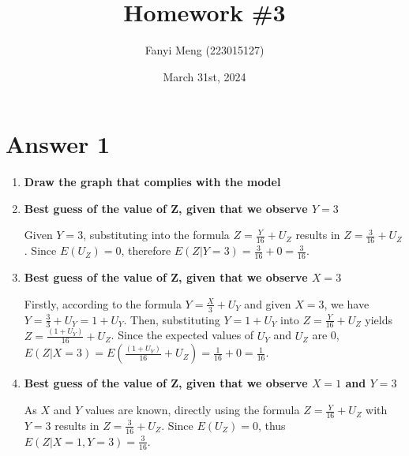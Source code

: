 \documentclass[
	12pt, %
]{fphw}
\title{Homework \#3} %
\author{Fanyi Meng (223015127)} %
\date{March 31st, 2024} %
\institute{The Chinese University of Hongkong, Shenzhen \\ Computer and Information Engineering} %
\begin{document}
\maketitle %


\section*{Answer 1	}

\begin{enumerate}
\item \textbf{Draw the graph that complies with the model}



\item \textbf{Best guess of the value of Z, given that we observe \( Y = 3 \)}

Given \( Y = 3 \), substituting into the formula \( Z = \frac{Y}{16} + U_Z \) results in \( Z = \frac{3}{16} + U_Z \). Since \( E(U_Z) = 0 \), therefore \( E(Z|Y=3) = \frac{3}{16} + 0 = \frac{3}{16} \).

\item \textbf{Best guess of the value of Z, given that we observe \( X = 3 \)}

Firstly, according to the formula \( Y = \frac{X}{3} + U_Y \) and given \( X = 3 \), we have \( Y = \frac{3}{3} + U_Y = 1 + U_Y \). Then, substituting \( Y = 1 + U_Y \) into \( Z = \frac{Y}{16} + U_Z \) yields \( Z = \frac{(1 + U_Y)}{16} + U_Z \). Since the expected values of \( U_Y \) and \( U_Z \) are 0, \( E(Z|X=3) = E\left(\frac{(1 + U_Y)}{16} + U_Z\right) = \frac{1}{16} + 0 = \frac{1}{16} \).

\item \textbf{Best guess of the value of Z, given that we observe \( X = 1 \) and \( Y = 3 \)}

As \( X \) and \( Y \) values are known, directly using the formula \( Z = \frac{Y}{16} + U_Z \) with \( Y = 3 \) results in \( Z = \frac{3}{16} + U_Z \). Since \( E(U_Z) = 0 \), thus \( E(Z|X=1, Y=3) = \frac{3}{16} \).
\end{enumerate}
  
\end{document}
